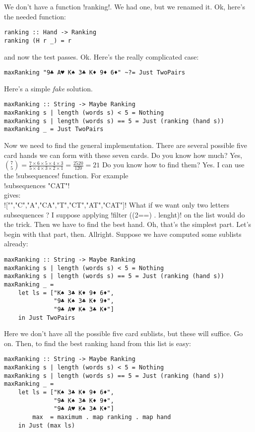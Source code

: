 We don't have a function \il!ranking!. We had one, but we renamed it.
\lhA Ok, here's the needed function:
\begin{lstlisting}[frame=single]
ranking :: Hand -> Ranking
ranking (H r _) = r
\end{lstlisting}
\success and now the test passes.
\lhN Ok. Here's the really complicated case:
\begin{lstlisting}[frame=single]
maxRanking "9♣ A♥ K♠ 3♣ K♦ 9♦ 6♦" ~?= Just TwoPairs
\end{lstlisting}
\lhA Here's a simple \emph{fake} solution.
\begin{lstlisting}[frame=single]
maxRanking :: String -> Maybe Ranking
maxRanking s | length (words s) < 5 = Nothing
maxRanking s | length (words s) == 5 = Just (ranking (hand s))
maxRanking _ = Just TwoPairs
\end{lstlisting}
\success Now we need to find the general implementation.
\lhN
There are several possible five card hands we can form with these seven cards. Do you know how much?
\lhA Yes, ${{7}\choose{5}} = \frac{7\times6 \times 5 \times 4 \times 3}{5 \times 4 \times 3 \times 2 \times 1} = \frac{2520}{120} = 21$
\lhN Do you know how to find them?
\lhA Yes. I can use the \il!subsequences! function. For example\\ 
\il!subsequences "CAT"! \\
gives: \\
\il!["","C","A","CA","T","CT","AT","CAT"]!
\lhN What if we want only two letters subsequences ?
\lhA I suppose applying \il!filter ((2==) . lenght)! on the list would do the trick.
\lhN Then we have to find the best hand.
\lhA Oh, that's the simplest part.
\lhN Let's begin with that part, then.
\lhA Allright. Suppose we have computed some sublists already:
\begin{lstlisting}[frame=single]
maxRanking :: String -> Maybe Ranking
maxRanking s | length (words s) < 5 = Nothing
maxRanking s | length (words s) == 5 = Just (ranking (hand s))
maxRanking _ = 
    let ls = ["K♠ 3♣ K♦ 9♦ 6♦", 
              "9♣ K♠ 3♣ K♦ 9♦", 
              "9♣ A♥ K♠ 3♣ K♦"]
    in Just TwoPairs
\end{lstlisting}
\success Here we don't have all the possible five card sublists, but these will suffice.
\lhN Go on.
\lhA Then, to find the best ranking hand from this list is easy:
\begin{lstlisting}[frame=single]
maxRanking :: String -> Maybe Ranking
maxRanking s | length (words s) < 5 = Nothing
maxRanking s | length (words s) == 5 = Just (ranking (hand s))
maxRanking _ = 
    let ls = ["K♠ 3♣ K♦ 9♦ 6♦", 
              "9♣ K♠ 3♣ K♦ 9♦", 
              "9♣ A♥ K♠ 3♣ K♦"]
        max  = maximum . map ranking . map hand
    in Just (max ls)
\end{lstlisting}
